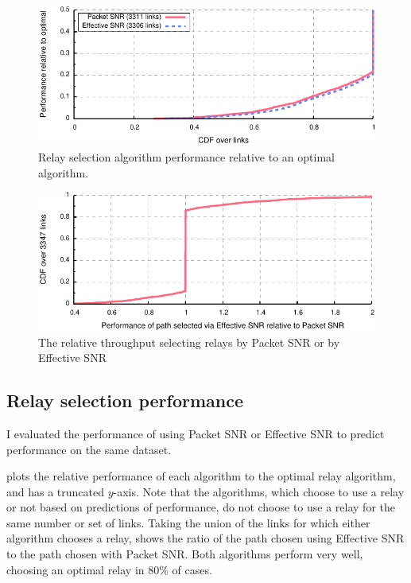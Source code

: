 \begin{figure}[t]
	\centering
	\includegraphics[width=\textwidth]{figures/applications/relay_ratio_opt.pdf}
	\caption{\label{fig:relay_ratio_opt}Relay selection algorithm performance relative to an optimal algorithm.}
\end{figure}
\begin{figure}[t]
	\centering
	\includegraphics[width=\textwidth]{figures/applications/relay_ratio.pdf}
	\caption{\label{fig:relay_ratio}The relative throughput selecting relays by Packet SNR or by Effective SNR}
\end{figure}

\subsection{Relay selection performance}
I evaluated the performance of  using Packet SNR or Effective SNR to predict performance on the same dataset.

 plots the relative performance of each algorithm to the optimal relay algorithm, and has a truncated $y$-axis. Note that the algorithms, which choose to use a relay or not based on predictions of performance, do not choose to use a relay for the same number or set of links. Taking the union of the links for which either algorithm chooses a relay,  shows the ratio of the path chosen using Effective SNR to the path chosen with Packet SNR. Both algorithms perform very well, choosing an optimal relay in 80\% of cases.

